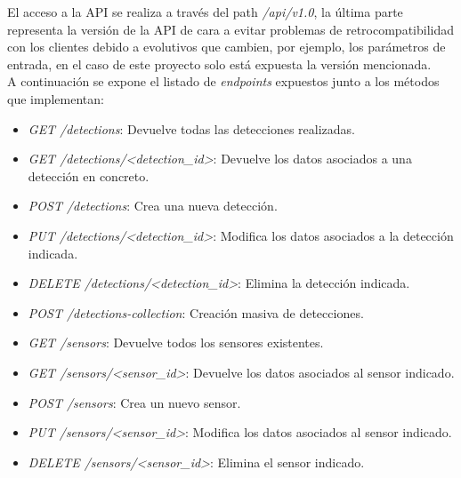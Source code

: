 \documentclass[../proyecto.tex]{subfiles}
\begin{document}
El acceso a la API se realiza a través del path \textit{/api/v1.0}, la última parte representa la versión de la API de cara a evitar problemas de retrocompatibilidad con los clientes debido a evolutivos que cambien, por ejemplo, los parámetros de entrada, en el caso de este proyecto solo está expuesta la versión mencionada.\\

A continuación se expone el listado de \textit{endpoints} expuestos junto a los métodos que implementan:\\


\begin{itemize}
  \item \textit{GET /detections}:  Devuelve todas las detecciones realizadas.
  \item \textit{GET /detections/<detection\_id>}: Devuelve los datos asociados a una detección en concreto.
  \item \textit{POST /detections}: Crea una nueva detección.
  \item \textit{PUT /detections/<detection\_id>}: Modifica los datos asociados a la detección indicada.
  \item \textit{DELETE /detections/<detection\_id>}: Elimina la detección indicada.
\end{itemize}


\begin{itemize}
\item \textit{POST /detections-collection}: Creación masiva de detecciones.
\end{itemize}


\begin{itemize}
  \item \textit{GET /sensors}: Devuelve todos los sensores existentes.
  \item \textit{GET /sensors/<sensor\_id>}: Devuelve los datos asociados al sensor indicado.
  \item \textit{POST /sensors}: Crea un nuevo sensor.
  \item \textit{PUT /sensors/<sensor\_id>}: Modifica los datos asociados al sensor indicado.
  \item \textit{DELETE /sensors/<sensor\_id>}: Elimina el sensor indicado.
\end{itemize}
\end{document}
